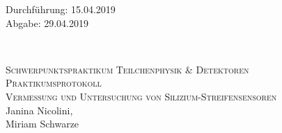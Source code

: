 



\begin{titlepage}
  \begin{flushleft}
 Durchführung: 15.04.2019\\
 Abgabe: 29.04.2019
  \end{flushleft}


\HRule\\[1,0cm]

 \begin{center}

  \textsc{\Large Schwerpunktspraktikum Teilchenphysik \& Detektoren}\\[1.5cm]
\textsc{\LARGE Praktikumsprotokoll}\\[1.5cm]
\textsc{\huge Vermessung und Untersuchung von Silizium-Streifensensoren} \\[5,5cm]

Janina Nicolini\footnotemark[1], \\
Miriam Schwarze\footnotemark[2] \\[1,0cm]



 \end{center}
\HRule

 \vfill

\end{titlepage}






\nocite{*}
\printbibliography


